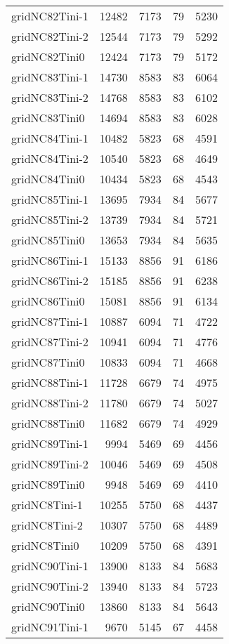 \begin{longtable}{lrrrr}
gridNC82Tini-1 & 12482 & 7173 & 79 & 5230 \\
gridNC82Tini-2 & 12544 & 7173 & 79 & 5292 \\
gridNC82Tini0 & 12424 & 7173 & 79 & 5172 \\
gridNC83Tini-1 & 14730 & 8583 & 83 & 6064 \\
gridNC83Tini-2 & 14768 & 8583 & 83 & 6102 \\
gridNC83Tini0 & 14694 & 8583 & 83 & 6028 \\
gridNC84Tini-1 & 10482 & 5823 & 68 & 4591 \\
gridNC84Tini-2 & 10540 & 5823 & 68 & 4649 \\
gridNC84Tini0 & 10434 & 5823 & 68 & 4543 \\
gridNC85Tini-1 & 13695 & 7934 & 84 & 5677 \\
gridNC85Tini-2 & 13739 & 7934 & 84 & 5721 \\
gridNC85Tini0 & 13653 & 7934 & 84 & 5635 \\
gridNC86Tini-1 & 15133 & 8856 & 91 & 6186 \\
gridNC86Tini-2 & 15185 & 8856 & 91 & 6238 \\
gridNC86Tini0 & 15081 & 8856 & 91 & 6134 \\
gridNC87Tini-1 & 10887 & 6094 & 71 & 4722 \\
gridNC87Tini-2 & 10941 & 6094 & 71 & 4776 \\
gridNC87Tini0 & 10833 & 6094 & 71 & 4668 \\
gridNC88Tini-1 & 11728 & 6679 & 74 & 4975 \\
gridNC88Tini-2 & 11780 & 6679 & 74 & 5027 \\
gridNC88Tini0 & 11682 & 6679 & 74 & 4929 \\
gridNC89Tini-1 & 9994 & 5469 & 69 & 4456 \\
gridNC89Tini-2 & 10046 & 5469 & 69 & 4508 \\
gridNC89Tini0 & 9948 & 5469 & 69 & 4410 \\
gridNC8Tini-1 & 10255 & 5750 & 68 & 4437 \\
gridNC8Tini-2 & 10307 & 5750 & 68 & 4489 \\
gridNC8Tini0 & 10209 & 5750 & 68 & 4391 \\
gridNC90Tini-1 & 13900 & 8133 & 84 & 5683 \\
gridNC90Tini-2 & 13940 & 8133 & 84 & 5723 \\
gridNC90Tini0 & 13860 & 8133 & 84 & 5643 \\
gridNC91Tini-1 & 9670 & 5145 & 67 & 4458 \\

\end{longtable}
